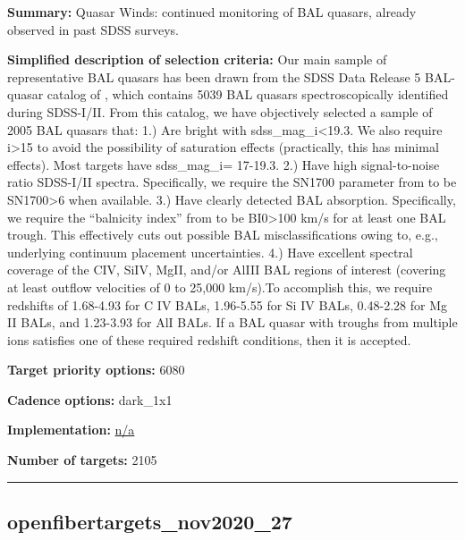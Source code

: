 \noindent\textbf{Summary:} Quasar Winds: continued monitoring of BAL quasars,
already observed in past SDSS surveys.

\noindent\textbf{Simplified description of selection criteria:} Our main sample
of representative BAL quasars has been drawn from the SDSS Data Release
5 BAL-quasar catalog of
\citealt{Gibson2009}, which contains 5039 BAL quasars spectroscopically
identified during SDSS-I/II. From this catalog, we have objectively
selected a sample of 2005 BAL quasars that: 1.) Are bright with
sdss\_mag\_i\textless19.3. We also require i\textgreater15 to avoid the
possibility of saturation effects (practically, this has minimal
effects). Most targets have sdss\_mag\_i= 17-19.3. 2.) Have high
signal-to-noise ratio SDSS-I/II spectra. Specifically, we require the
SN1700 parameter from
\citealt{Gibson2009} to be SN1700\textgreater6 when available. 3.) Have
clearly detected BAL absorption. Specifically, we require the
``balnicity index'' from
\citealt{Gibson2009} to be BI0\textgreater100 km/s for at least one BAL
trough. This effectively cuts out possible BAL misclassifications owing
to, e.g., underlying continuum placement uncertainties. 4.) Have
excellent spectral coverage of the CIV, SiIV, MgII, and/or AlIII BAL
regions of interest (covering at least outflow velocities of 0 to 25,000
km/s).To accomplish this, we require redshifts of 1.68-4.93 for C IV
BALs, 1.96-5.55 for Si IV BALs, 0.48-2.28 for Mg II BALs, and 1.23-3.93
for AlI BALs. If a BAL quasar with troughs from multiple ions satisfies
one of these required redshift conditions, then it is accepted.


\noindent\textbf{Target priority options:} 6080

\noindent\textbf{Cadence options:} dark\_1x1

\noindent\textbf{Implementation:}
\href{https://github.com/sdss/target_selection/blob/0.3.3/python/target_selection/cartons/n/a}{n/a}

\noindent\textbf{Number of targets:} 2105

\begin{center}\rule{0.5\linewidth}{0.5pt}\end{center}

\hypertarget{openfibertargets_nov2020_27_plan0.5.3}{%
\subsection{openfibertargets\_nov2020\_27}\label{openfibertargets_nov2020_27_plan0.5.3}}

